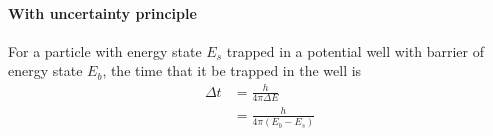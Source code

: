         \paragraph{With uncertainty principle}
            For a particle with energy state $E_s$ trapped in a potential well with barrier of energy state $E_b$, the time that it be trapped in the well is
            \begin{align}
                \Delta t &= \frac{h}{4 \pi \Delta E} \\
                         &= \frac{h}{4 \pi (E_b - E_s)}
            \end{align}

        
        





            
            